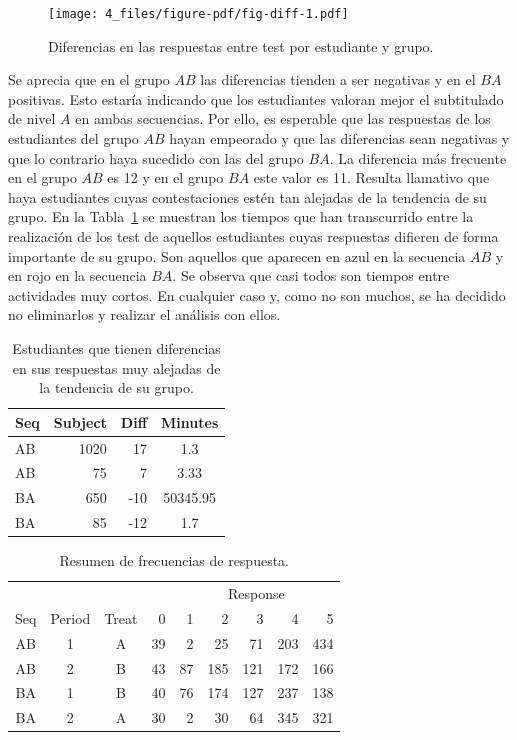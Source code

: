 \documentclass[
  12pt,
  a4paper,
  extrafontsizes,
  onecolumn,
  openright,
  table]{memoir}
\begin{document}
\begin{figure}[h]

{\centering \texttt{[image: 4\_files/figure-pdf/fig-diff-1.pdf]}

}

\caption{\label{fig-diff}Diferencias en las respuestas entre test por
estudiante y grupo.}

\end{figure}

Se aprecia que en el grupo \(AB\) las diferencias tienden a ser
negativas y en el \(BA\) positivas. Esto estaría indicando que los
estudiantes valoran mejor el subtitulado de nivel \(A\) en ambas
secuencias. Por ello, es esperable que las respuestas de los estudiantes
del grupo \(AB\) hayan empeorado y que las diferencias sean negativas y
que lo contrario haya sucedido con las del grupo \(BA\). La diferencia
más frecuente en el grupo \(AB\) es 12 y en el grupo \(BA\) este valor
es 11. Resulta llamativo que haya estudiantes cuyas contestaciones estén
tan alejadas de la tendencia de su grupo. En la Tabla~\ref{tbl-diff} se
muestran los tiempos que han transcurrido entre la realización de los
test de aquellos estudiantes cuyas respuestas difieren de forma
importante de su grupo. Son aquellos que aparecen en azul en la
secuencia \(AB\) y en rojo en la secuencia \(BA\). Se observa que casi
todos son tiempos entre actividades muy cortos. En cualquier caso y,
como no son muchos, se ha decidido no eliminarlos y realizar el análisis
con ellos.

\hypertarget{tbl-diff}{}
\begin{longtable}{lrrc}
\caption{\label{tbl-diff}Estudiantes que tienen diferencias en sus respuestas muy alejadas de la
tendencia de su grupo. }\tabularnewline

\toprule
Seq & Subject & Diff & Minutes \\ 
\midrule
AB & 1020 & 17 & 1.3 \\ 
AB & 75 & 7 & 3.33 \\ 
BA & 650 & -10 & 50345.95 \\ 
BA & 85 & -12 & 1.7 \\ 
\bottomrule
\end{longtable}

\hypertarget{tbl-resume}{}
\begin{longtable}{cccrrrrrr}
\caption{\label{tbl-resume}Resumen de frecuencias de respuesta. }\tabularnewline

\toprule
 &  &  &  & \multicolumn{5}{c}{Response} \\ 
\cmidrule(lr){5-9}
Seq & Period & Treat & 0 & 1 & 2 & 3 & 4 & 5 \\ 
\midrule
AB & 1 & A & 39 & 2 & 25 & 71 & 203 & 434 \\ 
AB & 2 & B & 43 & 87 & 185 & 121 & 172 & 166 \\ 
BA & 1 & B & 40 & 76 & 174 & 127 & 237 & 138 \\ 
BA & 2 & A & 30 & 2 & 30 & 64 & 345 & 321 \\ 
\bottomrule
\end{longtable}
\end{document}
